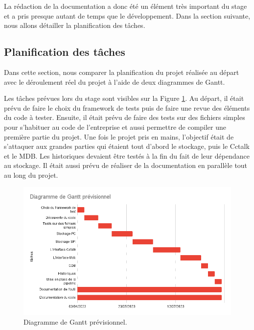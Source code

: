 \documentclass[a4paper]{article}
\begin{document}
La rédaction de la documentation a donc été un élément très important du stage
et a pris presque autant de temps que le développement. Dans la section
suivante, nous allons détailler la planification des tâches.

\clearpage
\subsection{Planification des tâches}%

Dans cette section, nous comparer la planification du projet réalisée au départ
avec le déroulement réel du projet à l'aide de deux diagrammes de Gantt.

Les tâches prévues lors du stage sont visibles sur la Figure
\ref{fig:expectedgantt}. Au départ, il était prévu de faire le choix du
framework de tests puis de faire une revue des éléments du code à tester.
Ensuite, il était prévu de faire des tests sur des fichiers simples pour
s'habituer au code de l'entreprise et aussi permettre de compiler une première
partie du projet. Une fois le projet pris en mains, l'objectif était de
s'attaquer aux grandes parties qui étaient tout d'abord le stockage, puis le
Cctalk et le MDB. Les historiques devaient être testés à la fin du fait de leur
dépendance au stockage. Il était aussi prévu de réaliser de la documentation en
parallèle tout au long du projet.

\begin{figure}[h!]
  \begin{center}
  \includegraphics[scale=0.6]{./img/expected-gantt.png}
  \caption{Diagramme de Gantt prévisionnel.}
  \end{center}
  \label{fig:expectedgantt}
\end{figure}
\end{document}
